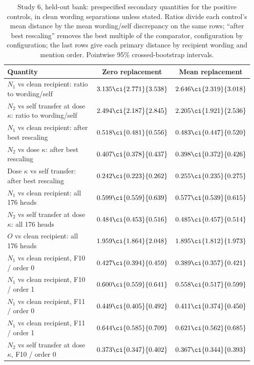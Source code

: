 \begin{table}[htbp]
\centering\small
\caption{Study 6, held-out bank: prespecified secondary quantities for the positive controls, in clean wording separations unless stated. Ratios divide each control's mean distance by the mean wording/self discrepancy on the same rows; ``after best rescaling'' removes the best multiple of the comparator, configuration by configuration; the last rows give each primary distance by recipient wording and mention order. Pointwise 95\% crossed-bootstrap intervals.}
\label{tab:positive-control-secondary}
\footnotesize\setlength{\tabcolsep}{4pt}
\begin{tabular}{@{}lcc@{}}
\toprule
Quantity & Zero replacement & Mean replacement \\
\midrule
$N_1$ vs clean recipient: ratio to wording/self & $3.135\ci{2.771}{3.538}$ & $2.646\ci{2.319}{3.018}$ \\
$N_2$ vs self transfer at dose $\kappa$: ratio to wording/self & $2.494\ci{2.187}{2.845}$ & $2.205\ci{1.921}{2.536}$ \\
$N_1$ vs clean recipient: after best rescaling & $0.518\ci{0.481}{0.556}$ & $0.483\ci{0.447}{0.520}$ \\
$N_2$ vs dose $\kappa$: after best rescaling & $0.407\ci{0.378}{0.437}$ & $0.398\ci{0.372}{0.426}$ \\
Dose $\kappa$ vs self transfer: after best rescaling & $0.242\ci{0.223}{0.262}$ & $0.255\ci{0.235}{0.275}$ \\
$N_1$ vs clean recipient: all 176 heads & $0.599\ci{0.559}{0.639}$ & $0.577\ci{0.539}{0.615}$ \\
$N_2$ vs self transfer at dose $\kappa$: all 176 heads & $0.484\ci{0.453}{0.516}$ & $0.485\ci{0.457}{0.514}$ \\
$O$ vs clean recipient: all 176 heads & $1.959\ci{1.864}{2.048}$ & $1.895\ci{1.812}{1.973}$ \\
\addlinespace
$N_1$ vs clean recipient, F10 / order 0 & $0.427\ci{0.394}{0.459}$ & $0.389\ci{0.357}{0.421}$ \\
$N_1$ vs clean recipient, F10 / order 1 & $0.600\ci{0.559}{0.641}$ & $0.558\ci{0.517}{0.599}$ \\
$N_1$ vs clean recipient, F11 / order 0 & $0.449\ci{0.405}{0.492}$ & $0.411\ci{0.374}{0.450}$ \\
$N_1$ vs clean recipient, F11 / order 1 & $0.644\ci{0.585}{0.709}$ & $0.621\ci{0.562}{0.685}$ \\
$N_2$ vs self transfer at dose $\kappa$, F10 / order 0 & $0.373\ci{0.347}{0.402}$ & $0.367\ci{0.344}{0.393}$ \\

\end{tabular}
\end{table}
